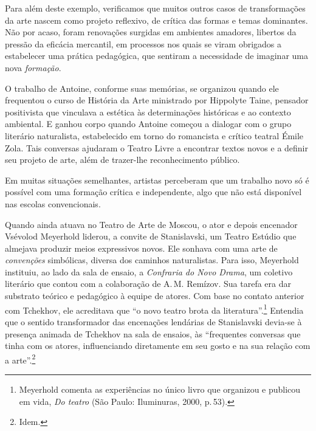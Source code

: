 Para além deste exemplo, verificamos que muitos outros casos de
transformações da arte nascem como projeto reflexivo, de crítica das
formas e temas dominantes. Não por acaso, foram renovações surgidas em
ambientes amadores, libertos da pressão da eficácia mercantil,
em processos nos quais se viram obrigados a estabelecer uma prática
pedagógica, que sentiram a necessidade de imaginar uma nova
{\it formação}.

O trabalho de Antoine, conforme suas memórias, se organizou
quando ele frequentou o curso de História da Arte ministrado por Hippolyte
Taine, pensador positivista que vinculava a estética às determinações
históricas e ao contexto ambiental. E ganhou corpo quando Antoine
começou a dialogar com o grupo literário naturalista, estabelecido em
torno do romancista e crítico teatral Émile Zola. Tais conversas
ajudaram o Teatro Livre a encontrar textos novos e a definir seu
projeto de arte, além de trazer-lhe reconhecimento público.

Em muitas situações semelhantes, artistas perceberam que um trabalho
novo só é possível com uma formação crítica e independente, algo que não
está disponível nas escolas convencionais.

Quando ainda atuava no Teatro de Arte de Moscou, o ator e depois
encenador Vsévolod Meyerhold liderou, a convite de Stanislavski, um
Teatro Estúdio que almejava produzir meios expressivos novos. Ele
sonhava com uma arte de {\it convenções} simbólicas, diversa dos
caminhos naturalistas. Para isso, Meyerhold instituiu, ao lado da sala
de ensaio, a {\it Confraria do Novo Drama}, um coletivo literário que
contou com a colaboração de A.\,M. Remízov. Sua tarefa era dar substrato
teórico e pedagógico à equipe de atores. Com base no contato anterior
com Tchekhov, ele acreditava que “o novo teatro brota da
literatura”.\footnote{Meyerhold comenta as experiências no único livro
  que organizou e publicou em vida, {\it Do teatro} (São Paulo:
  Iluminuras, 2000, p.\,53).} Entendia que o sentido transformador das
encenações lendárias de Stanislavski devia-se à presença animada de
Tchekhov na sala de ensaios, às “frequentes conversas que tinha com os
atores, influenciando diretamente em seu gosto e na sua relação com a
arte”.\footnote{Idem.}

